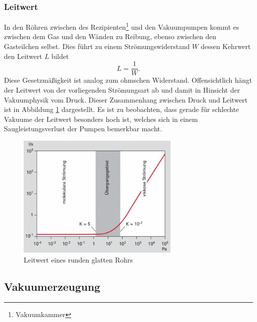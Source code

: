 \subsubsection{Leitwert}
In den Röhren zwischen des Rezipienten\footnote{Vakuumkammer} und den Vakuumpumpen kommt es zwischen dem Gas 
und den Wänden zu Reibung, ebenso zwischen den Gasteilchen selbst.
Dies führt zu einem Strömungswiderstand $W$ dessen Kehrwert den Leitwert $L$ bildet
\begin{equation}
    L = \frac{1}{W}.
\end{equation}
Diese Gesetzmäßigkeit ist analog zum ohmschen Widerstand.
Offensichtlich hängt der Leitwert von der vorliegenden Strömungsart ab
und damit in Hinsicht der Vakuumphysik vom Druck.
Dieser Zusammenhang zwischen Druck und Leitwert ist in Abbildung \ref{fig:leitwert} dargestellt.
Es ist zu beobachten, dass gerade für schlechte Vakuume der Leitwert besonders hoch ist,
welches sich in einem Saugleistungsverlust der Pumpen bemerkbar macht.
\begin{figure}[h]
    \centering
    \includegraphics[width=0.7\textwidth]{abb/leitwert.png}
    \caption{Leitwert eines runden glatten Rohrs \cite{Pfeifer}} 
    \label{fig:leitwert}
\end{figure} 



\subsection{Vakuumerzeugung}

